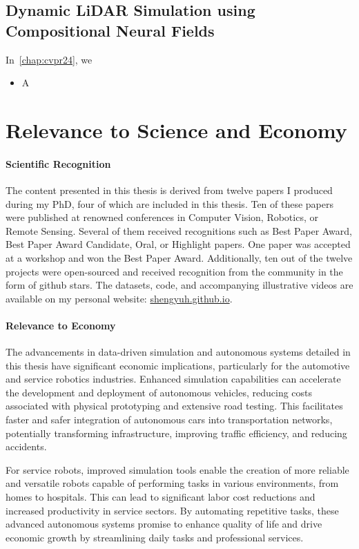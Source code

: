 \subsection{Dynamic LiDAR Simulation using Compositional Neural Fields}

In~\cref{chap:cvpr24}, we 

\begin{itemize}
\item A
\end{itemize}




\section{Relevance to Science and Economy}

\paragraph{Scientific Recognition}
The content presented in this thesis is derived from twelve papers I produced during my PhD, four of which are included in this thesis. Ten of these papers were published at renowned conferences in Computer Vision, Robotics, or Remote Sensing. Several of them received recognitions such as Best Paper Award, Best Paper Award Candidate, Oral, or Highlight papers. One paper was accepted at a workshop and won the Best Paper Award. Additionally, ten out of the twelve projects were open-sourced and received recognition from the community in the form of github stars. The datasets, code, and accompanying illustrative videos are available on my personal website: \url{shengyuh.github.io}.

\paragraph{Relevance to Economy}
The advancements in data-driven simulation and autonomous systems detailed in this thesis have significant economic implications, particularly for the automotive and service robotics industries. Enhanced simulation capabilities can accelerate the development and deployment of autonomous vehicles, reducing costs associated with physical prototyping and extensive road testing. This facilitates faster and safer integration of autonomous cars into transportation networks, potentially transforming infrastructure, improving traffic efficiency, and reducing accidents.

For service robots, improved simulation tools enable the creation of more reliable and versatile robots capable of performing tasks in various environments, from homes to hospitals. This can lead to significant labor cost reductions and increased productivity in service sectors. By automating repetitive tasks, these advanced autonomous systems promise to enhance quality of life and drive economic growth by streamlining daily tasks and professional services.